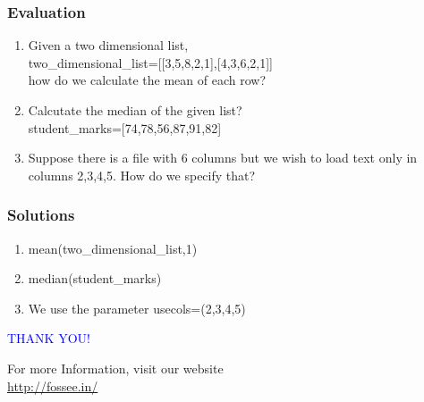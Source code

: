 \documentclass[presentation]{beamer}
\begin{document}
\begin{frame}
\frametitle{Evaluation}
\label{sec-8}


\begin{enumerate}
\item Given a two dimensional list,\\
     two\_dimensional\_list=[[3,5,8,2,1],[4,3,6,2,1]]\\
     how do we calculate the mean  of each row?
\vspace{8pt}
\item Calcutate the median of the given list?\\
     student\_marks=[74,78,56,87,91,82]
\vspace{8pt}
\item Suppose there is a file with 6 columns but we wish to load text 
     only in columns 2,3,4,5. How do we specify that?
\end{enumerate}
\end{frame}
\begin{frame}
\frametitle{Solutions}
\label{sec-9}


\begin{enumerate}
\item mean(two\_dimensional\_list,1)
\vspace{12pt}
\item median(student\_marks)
\vspace{12pt}
\item We use the parameter usecols=(2,3,4,5)
\end{enumerate}
\end{frame}
\begin{frame}

 \begin{block}{}
  \begin{center}
  \textcolor{blue}{\Large THANK YOU!} 
  \end{center}
  \end{block}
\begin{block}{}
  \begin{center}
    For more Information, visit our website\\
    \url{http://fossee.in/}
  \end{center}  
  \end{block}
\end{frame}
\end{document}

